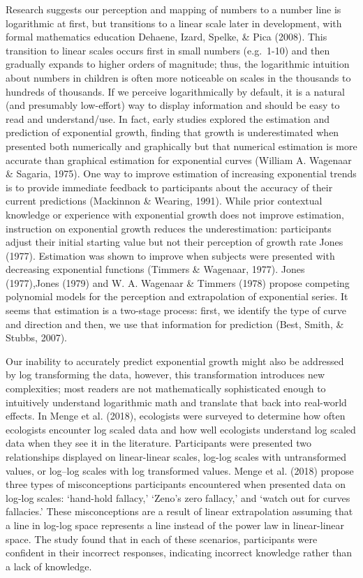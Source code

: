 \documentclass[print]{nuthesis}
\begin{document}
Research suggests our perception and mapping of numbers to a number line is logarithmic at first, but transitions to a linear scale later in development, with formal mathematics education Dehaene, Izard, Spelke, \& Pica (2008).
This transition to linear scales occurs first in small numbers (e.g.~1-10) and then gradually expands to higher orders of magnitude; thus, the logarithmic intuition about numbers in children is often more noticeable on scales in the thousands to hundreds of thousands.
If we perceive logarithmically by default, it is a natural (and presumably low-effort) way to display information and should be easy to read and understand/use.
In fact, early studies explored the estimation and prediction of exponential growth, finding that growth is underestimated when presented both numerically and graphically but that numerical estimation is more accurate than graphical estimation for exponential curves (William A. Wagenaar \& Sagaria, 1975).
One way to improve estimation of increasing exponential trends is to provide immediate feedback to participants about the accuracy of their current predictions (Mackinnon \& Wearing, 1991).
While prior contextual knowledge or experience with exponential growth does not improve estimation, instruction on exponential growth reduces the underestimation: participants adjust their initial starting value but not their perception of growth rate Jones (1977).
Estimation was shown to improve when subjects were presented with decreasing exponential functions (Timmers \& Wagenaar, 1977).
Jones (1977),Jones (1979) and W. A. Wagenaar \& Timmers (1978) propose competing polynomial models for the perception and extrapolation of exponential series.
It seems that estimation is a two-stage process: first, we identify the type of curve and direction and then, we use that information for prediction (Best, Smith, \& Stubbs, 2007).

Our inability to accurately predict exponential growth might also be addressed by log transforming the data, however, this transformation introduces new complexities; most readers are not mathematically sophisticated enough to intuitively understand logarithmic math and translate that back into real-world effects.
In Menge et al. (2018), ecologists were surveyed to determine how often ecologists encounter log scaled data and how well ecologists understand log scaled data when they see it in the literature.
Participants were presented two relationships displayed on linear-linear scales, log-log scales with untransformed values, or log--log scales with log transformed values.
Menge et al. (2018) propose three types of misconceptions participants encountered when presented data on log-log scales:
`hand-hold fallacy,' `Zeno's zero fallacy,' and `watch out for curves fallacies.' These misconceptions are a result of linear extrapolation assuming that a line in log-log space represents a line instead of the power law in linear-linear space. The study found that in each of these scenarios, participants were confident in their incorrect responses, indicating incorrect knowledge rather than a lack of knowledge.
\end{document}

